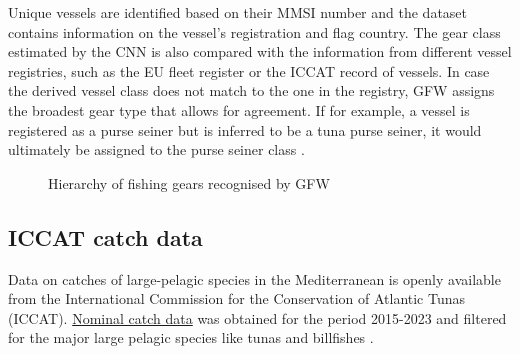Unique vessels are identified based on their MMSI number and the dataset contains information on
the vessel's registration and flag country. The gear class estimated by the CNN is also compared
with the information from different vessel registries, such as the EU fleet register or the ICCAT
record of vessels. In case the derived vessel class does not match to the one in the registry, GFW
assigns the broadest gear type that allows for agreement. If for example, a vessel is registered as
a purse seiner but is inferred to be a tuna purse seiner, it would ultimately be assigned to the
purse seiner class . \medskip
\begin{figure}[htbp]
	\centering
	\medskip
	\caption{Hierarchy of fishing gears recognised by GFW}
	\label{fig:vessel_classification}
\end{figure}

\subsection{ICCAT catch data}
Data on catches of large-pelagic species in the Mediterranean is openly available from the
International Commission for the Conservation of Atlantic Tunas (ICCAT).
\href{https://www.iccat.int/en/accesingdb.htm}{Nominal catch data} was obtained for the period
2015-2023 and filtered for the major large pelagic species like tunas and billfishes
\citep{iccat_catches}.

